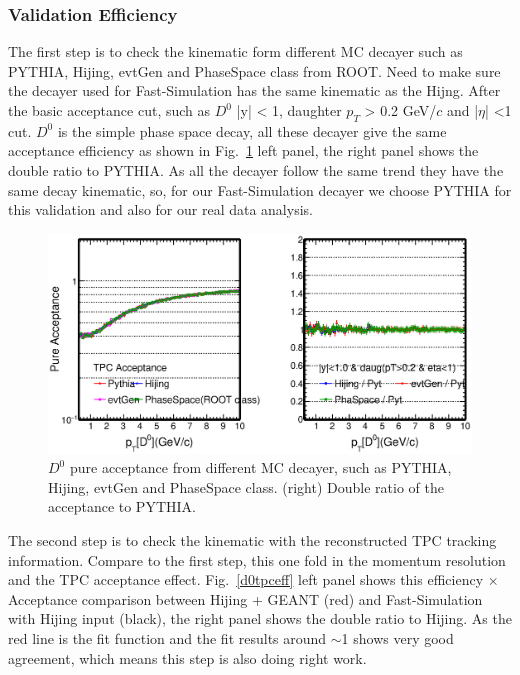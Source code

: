 \documentclass[a4paper]{article}
\begin{document}
\subsubsection{Validation Efficiency}
\label{validationeff}

The first step is to check the kinematic form different MC decayer such as PYTHIA, Hijing, evtGen and PhaseSpace class from ROOT. Need to make sure the decayer used for Fast-Simulation has the same kinematic as the Hijng. After the basic acceptance cut, such as $D^0$ |y| < 1, daughter $p_T$ > 0.2 GeV/$c$ and |$\eta$| <1 cut. $D^0$ is the simple phase space decay, all these decayer give the same acceptance efficiency as shown in Fig.~\ref{d0decayer} left panel, the right panel shows the double ratio to PYTHIA. As all the decayer follow the same trend they have the same decay kinematic, so, for our Fast-Simulation decayer we choose PYTHIA for this validation and also for our real data analysis.

\begin{figure}[htbp]
\centering
\includegraphics[keepaspectratio,width=1.0\textwidth]{fig/Acceptance_D0Decayer.eps}
\caption{$D^0$ pure acceptance from different MC decayer, such as PYTHIA, Hijing, evtGen and PhaseSpace class. (right) Double ratio of the acceptance to PYTHIA.}
\label{d0decayer}
\end{figure}

The second step is to check the kinematic with the reconstructed TPC tracking information. Compare to the first step, this one fold in the momentum resolution and the TPC acceptance effect. Fig.~\ref{d0tpceff} left panel shows this efficiency $\times$ Acceptance comparison between Hijing + GEANT (red) and Fast-Simulation with Hijing input (black), the right panel shows the double ratio to Hijing. As the red line is the fit function and the fit results around $\sim$1 shows very good agreement, which means this step is also doing right work.
\end{document}
